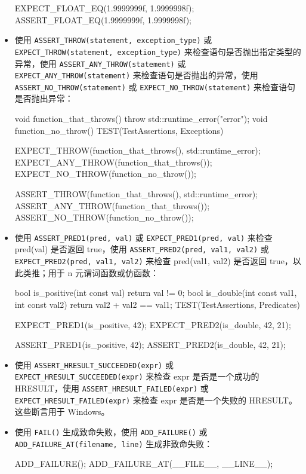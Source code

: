 \begin{itemize}
\begin{cpp}
EXPECT_FLOAT_EQ(1.9999999f, 1.9999998f);
ASSERT_FLOAT_EQ(1.9999999f, 1.9999998f);
\end{cpp}

\item
使用 \verb|ASSERT_THROW(statement, exception_type)| 或 \verb|EXPECT_THROW(statement, exception_type)| 来检查语句是否抛出指定类型的异常，使用 \verb|ASSERT_ANY_THROW(statement)| 或 \verb|EXPECT_ANY_THROW(statement)| 来检查语句是否抛出的异常，使用 \verb|ASSERT_NO_THROW(statement)| 或 \verb|EXPECT_NO_THROW(statement)| 来检查语句是否抛出异常：

\begin{cpp}
void function_that_throws()
{
    throw std::runtime_error("error");
}
void function_no_throw()
{
}
TEST(TestAssertions, Exceptions)
{
    EXPECT_THROW(function_that_throws(), std::runtime_error);
    EXPECT_ANY_THROW(function_that_throws());
    EXPECT_NO_THROW(function_no_throw());

    ASSERT_THROW(function_that_throws(), std::runtime_error);
    ASSERT_ANY_THROW(function_that_throws());
    ASSERT_NO_THROW(function_no_throw());
}
\end{cpp}

\item
使用 \verb|ASSERT_PRED1(pred, val)| 或 \verb|EXPECT_PRED1(pred, val)| 来检查 pred(val) 是否返回 true，使用 \verb|ASSERT_PRED2(pred, val1, val2)| 或 \verb|EXPECT_PRED2(pred, val1, val2)| 来检查 pred(val1, val2) 是否返回 true，以此类推；用于 n 元谓词函数或仿函数：

\begin{cpp}
bool is_positive(int const val)
{
    return val != 0;
}
bool is_double(int const val1, int const val2)
{
    return val2 + val2 == val1;
}
TEST(TestAssertions, Predicates)
{
    EXPECT_PRED1(is_positive, 42);
    EXPECT_PRED2(is_double, 42, 21);

    ASSERT_PRED1(is_positive, 42);
    ASSERT_PRED2(is_double, 42, 21);
}
\end{cpp}

\item
使用 \verb|ASSERT_HRESULT_SUCCEEDED(expr)| 或 \verb|EXPECT_HRESULT_SUCCEEDED(expr)| 来检查 expr 是否是一个成功的 HRESULT，使用 \verb|ASSERT_HRESULT_FAILED(expr)| 或 \verb|EXPECT_HRESULT_FAILED(expr)| 来检查 expr 是否是一个失败的 HRESULT。这些断言用于 Windows。

\item
使用 \verb|FAIL()| 生成致命失败，使用 \verb|ADD_FAILURE()| 或 \verb|ADD_FAILURE_AT(filename, line)| 生成非致命失败：

\begin{cpp}
ADD_FAILURE();
ADD_FAILURE_AT(__FILE__, __LINE__);
\end{cpp}
\end{itemize}

